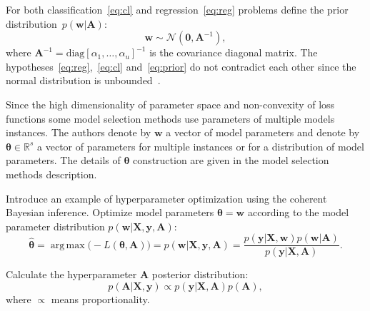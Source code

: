 \documentclass[12pt]{article}
\DeclareMathOperator*{\argmax}{arg\,max}
\begin{document}
For both classification~\eqref{eq:cl} and regression~\eqref{eq:reg} problems define the prior distribution~$p(\mathbf{w}|\mathbf{A})$:
\begin{equation}
\label{eq:prior}
	\mathbf{w} \sim \mathcal{N}(\mathbf{0}, \mathbf{A}^{-1}),
\end{equation}
where  $\mathbf{A}^{-1} = \text{diag}[\alpha_1, \dots, \alpha_u]^{-1}$ is the covariance  diagonal matrix. The hypotheses~\eqref{eq:reg},~\eqref{eq:cl} and~\eqref{eq:prior} 	do	not	contradict	each other since the normal distribution is unbounded~\cite{bayes_constr}.  %


Since the high dimensionality  of parameter space and non-convexity of loss functions some model selection methods use parameters of multiple models instances. The authors denote by $\mathbf{w}$ a vector of model parameters and denote by $\boldsymbol{\theta} \in \mathbb{R}^s$ a vector of parameters for multiple instances or for a distribution of model parameters. The details of $\boldsymbol{\theta}$ construction are given in the model selection methods description.

Introduce an example of hyperparameter optimization using the coherent Bayesian inference. Optimize model parameters $\boldsymbol{\theta} = \mathbf{w}$ according to the model parameter distribution $p(\mathbf{w}|\mathbf{X}, \mathbf{y}, \mathbf{A})$:
\begin{equation}
\label{eq:bayes1}
\hat{\boldsymbol{\theta}} = \argmax \bigl(-L(\boldsymbol{\theta}, \mathbf{A})\bigr) = p(\mathbf{w}|\mathbf{X}, \mathbf{y}, \mathbf{A}) = \frac{p(\mathbf{y}|\mathbf{X},\mathbf{w})p(\mathbf{w}|\mathbf{A})}{p(\mathbf{y}|\mathbf{X},\mathbf{A})}.
\end{equation}

Calculate the hyperparameter  $\mathbf{A}$ posterior distribution:
\[
p(\mathbf{A}|\mathbf{X}, \mathbf{y}) \propto p(\mathbf{y}|\mathbf{X},\mathbf{A})p(\mathbf{A}),
\]
where $\propto$ means proportionality.
\end{document}
